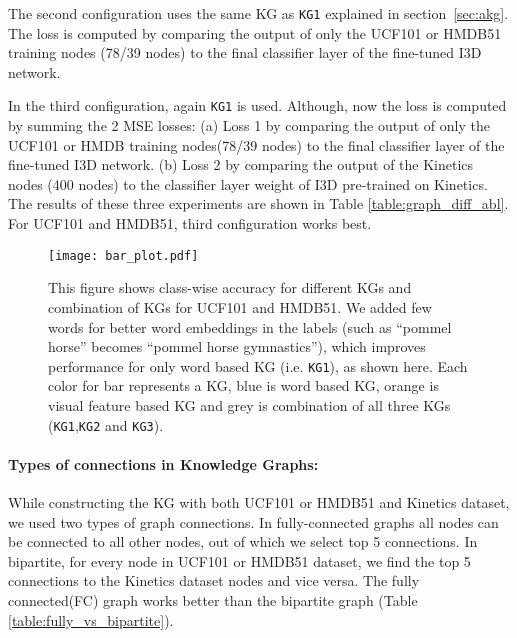 The second configuration uses the same KG as \texttt{KG1} explained in section~\ref{sec:akg}. The loss is computed by comparing the output of only the UCF101 or HMDB51 training nodes (78/39 nodes) to the final classifier layer of the fine-tuned I3D network.

In the third configuration, again \texttt{KG1} is used. Although, now the loss is computed by summing the 2 MSE losses:
(a) Loss 1 by comparing the output of only the UCF101 or HMDB training nodes(78/39 nodes) to the final classifier layer of the fine-tuned I3D network.
(b) Loss 2 by comparing the output of the Kinetics nodes (400 nodes) to the classifier layer weight of I3D pre-trained on Kinetics.
The results of these three experiments are shown in Table \ref{table:graph_diff_abl}. For UCF101 and HMDB51, third configuration works best. 







\begin{figure*}
\centering
 \texttt{[image: bar\_plot.pdf]}
\caption{This figure shows class-wise accuracy for different KGs and combination of KGs for UCF101 and HMDB51. We added few words for better word embeddings in the labels (such as ``pommel horse'' becomes ``pommel horse gymnastics''), which improves performance for only word based KG (i.e. \texttt{KG1}), as shown here. Each color for bar represents a KG, blue is word based KG, orange is visual feature based KG and grey is combination of all three KGs (\texttt{KG1},\texttt{KG2} and \texttt{KG3}).}
\label{fig:bar_plot}
\end{figure*}

\paragraph{\bf Types of connections in Knowledge Graphs:}

While constructing the KG with both UCF101 or HMDB51 and Kinetics dataset, we used two types of graph connections. In fully-connected graphs all nodes can be connected to all other nodes, out of which we select top 5 connections. In bipartite, for every node in UCF101 or HMDB51 dataset, we find the top 5 connections to the Kinetics dataset nodes and vice versa. The fully connected(FC) graph works better than the bipartite graph (Table \ref{table:fully_vs_bipartite}).


